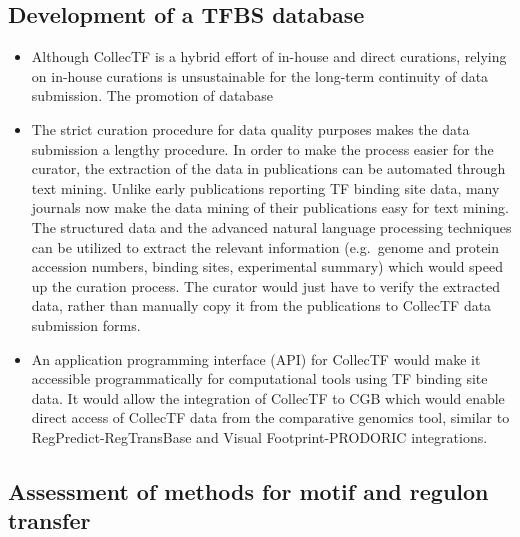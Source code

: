 \documentclass[12pt]{article}
\begin{document}
\subsection{Development of a TFBS database}

\begin{itemize}

\item Although CollecTF is a hybrid effort of in-house and direct curations,
  relying on in-house curations is unsustainable for the long-term continuity
  of data submission. The promotion of database

\item The strict curation procedure for data quality purposes makes the data
  submission a lengthy procedure. In order to make the process easier for the
  curator, the extraction of the data in publications can be automated through
  text mining. Unlike early publications reporting TF binding site data, many
  journals now make the data mining of their publications easy for text
  mining. The structured data and the advanced natural language processing
  techniques can be utilized to extract the relevant information (e.g.\ genome
  and protein accession numbers, binding sites, experimental summary) which
  would speed up the curation process. The curator would just have to verify
  the extracted data, rather than manually copy it from the publications to
  CollecTF data submission forms.

\item An application programming interface (API) for CollecTF would make it
  accessible programmatically for computational tools using TF binding site
  data. It would allow the integration of CollecTF to CGB which would enable
  direct access of CollecTF data from the comparative genomics tool, similar to
  RegPredict-RegTransBase and Visual Footprint-PRODORIC integrations.
\end{itemize}

\subsection{Assessment of methods for motif and regulon transfer}
\end{document}
